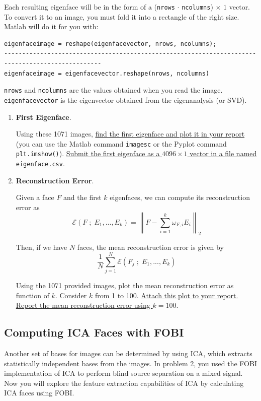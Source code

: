Each resulting eigenface will be in the form of a (\texttt{nrows} $\cdot$ \texttt{ncolumns}) $\times$ $1$ vector. To convert it to an image, you must
fold it into a rectangle of the right size. Matlab will do it for you with:
\begin{lstlisting}
eigenfaceimage = reshape(eigenfacevector, nrows, ncolumns);
-------------------------------------------------------------------------------------------------
eigenfaceimage = eigenfacevector.reshape(nrows, ncolumns)
\end{lstlisting}
\texttt{nrows} and \texttt{ncolumns} are the values obtained when you read the image. \texttt{eigenfacevector} is the eigenvector obtained from the eigenanalysis (or SVD).

\begin{enumerate}
    \item \textbf{First Eigenface}. 
    
    Using these 1071 images, \ul{find the first eigenface and plot it in your report} (you can use the Matlab command \texttt{imagesc} or the Pyplot command \texttt{plt.imshow()}). \ul{Submit the first eigenface as a $4096 \times 1$ vector in a file named \texttt{eigenface.csv}}.
    
    \item \textbf{Reconstruction Error}. 
    
    Given a face $F$ and the first $k$ eigenfaces, we can compute its reconstruction error as
    \begin{equation}
     \mathcal{E}(F \; ; \; E_1,...,E_k) = \left\| F - \sum_{i=1}^k \omega_{F,i} E_i \right\|_2
    \end{equation}
    
    Then, if we have $N$ faces, the mean reconstruction error is given by
    \begin{equation}
        \frac{1}{N} \sum_{j=1}^N \mathcal{E}(F_j \; ; \; E_1,...,E_k)
    \end{equation}
     
    Using the 1071 provided images, plot the mean reconstruction error as function of $k$. Consider $k$ from 1 to 100. \ul{Attach this plot to your report. Report the mean reconstruction error using $k=100$}.
    
\end{enumerate}

\subsection{Computing ICA Faces with FOBI}
Another set of bases for images can be determined by using ICA, which extracts statistically independent bases from the images. In problem 2, you used the FOBI implementation of ICA to perform blind source separation on a mixed signal. Now you will explore the feature extraction capabilities of ICA by calculating ICA faces using FOBI.

